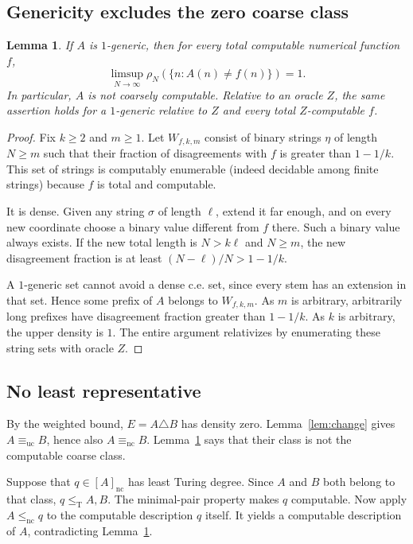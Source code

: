 \documentclass[11pt,a4paper]{article}
\newcommand{\leT}{\leq_{\mathrm T}}
\newcommand{\nc}{\mathrm{nc}}
\newcommand{\uc}{\mathrm{uc}}
\newtheorem{lemma}[theorem]{Lemma}
\theoremstyle{definition}
\theoremstyle{remark}
\begin{document}
\subsection{Genericity excludes the zero coarse class}
\begin{lemma}\label{lem:generic-not-coarse}
If $A$ is $1$-generic, then for every total computable numerical function $f$,
\[
\limsup_{N\to\infty}\rho_N(\{n:A(n)\ne f(n)\})=1.
\]
In particular, $A$ is not coarsely computable. Relative to an oracle $Z$, the same assertion holds for a $1$-generic relative to $Z$ and every total $Z$-computable $f$.
\end{lemma}
\begin{proof}
Fix $k\geq2$ and $m\geq1$. Let $W_{f,k,m}$ consist of binary strings $\eta$ of length $N\geq m$ such that their fraction of disagreements with $f$ is greater than $1-1/k$. This set of strings is computably enumerable (indeed decidable among finite strings) because $f$ is total and computable.

It is dense. Given any string $\sigma$ of length $\ell$, extend it far enough, and on every new coordinate choose a binary value different from $f$ there. Such a binary value always exists. If the new total length is $N>k\ell$ and $N\geq m$, the new disagreement fraction is at least $(N-\ell)/N>1-1/k$.

A $1$-generic set cannot avoid a dense c.e. set, since every stem has an extension in that set. Hence some prefix of $A$ belongs to $W_{f,k,m}$. As $m$ is arbitrary, arbitrarily long prefixes have disagreement fraction greater than $1-1/k$. As $k$ is arbitrary, the upper density is $1$. The entire argument relativizes by enumerating these string sets with oracle $Z$.
\end{proof}

\subsection{No least representative}
By the weighted bound, $E=A\triangle B$ has density zero. Lemma~\ref{lem:change} gives $A\equiv_{\uc}B$, hence also $A\equiv_{\nc}B$. Lemma~\ref{lem:generic-not-coarse} says that their class is not the computable coarse class.

Suppose that $q\in[A]_{\nc}$ has least Turing degree. Since $A$ and $B$ both belong to that class, $q\leT A,B$. The minimal-pair property makes $q$ computable. Now apply $A\leq_{\nc}q$ to the computable description $q$ itself. It yields a computable description of $A$, contradicting Lemma~\ref{lem:generic-not-coarse}.
\end{document}
